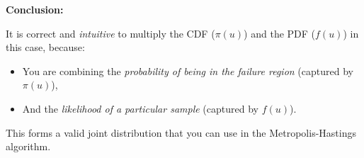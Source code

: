 \textbf{Conclusion:}

It is correct and \textit{intuitive} to multiply the CDF ($\pi(u)$) and the PDF ($f(u)$) in this case, because:
\begin{itemize}
    \item You are combining the \textit{probability of being in the failure region} (captured by $\pi(u)$),
    \item And the \textit{likelihood of a particular sample} (captured by $f(u)$).
\end{itemize}

This forms a valid joint distribution that you can use in the Metropolis-Hastings algorithm.
